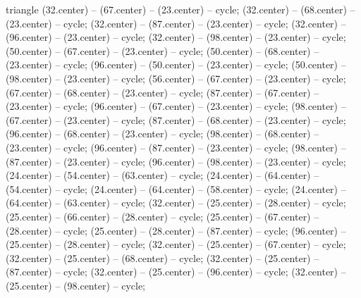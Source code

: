 \begin{pgfonlayer}{triangle}
 (32.center) -- (67.center) -- (23.center) -- cycle; 
 (32.center) -- (68.center) -- (23.center) -- cycle; 
 (32.center) -- (87.center) -- (23.center) -- cycle; 
 (32.center) -- (96.center) -- (23.center) -- cycle; 
 (32.center) -- (98.center) -- (23.center) -- cycle; 
 (50.center) -- (67.center) -- (23.center) -- cycle; 
 (50.center) -- (68.center) -- (23.center) -- cycle; 
 (96.center) -- (50.center) -- (23.center) -- cycle; 
 (50.center) -- (98.center) -- (23.center) -- cycle; 
 (56.center) -- (67.center) -- (23.center) -- cycle; 
 (67.center) -- (68.center) -- (23.center) -- cycle; 
 (87.center) -- (67.center) -- (23.center) -- cycle; 
 (96.center) -- (67.center) -- (23.center) -- cycle; 
 (98.center) -- (67.center) -- (23.center) -- cycle; 
 (87.center) -- (68.center) -- (23.center) -- cycle; 
 (96.center) -- (68.center) -- (23.center) -- cycle; 
 (98.center) -- (68.center) -- (23.center) -- cycle; 
 (96.center) -- (87.center) -- (23.center) -- cycle; 
 (98.center) -- (87.center) -- (23.center) -- cycle; 
 (96.center) -- (98.center) -- (23.center) -- cycle; 
 (24.center) -- (54.center) -- (63.center) -- cycle; 
 (24.center) -- (64.center) -- (54.center) -- cycle; 
 (24.center) -- (64.center) -- (58.center) -- cycle; 
 (24.center) -- (64.center) -- (63.center) -- cycle; 
 (32.center) -- (25.center) -- (28.center) -- cycle; 
 (25.center) -- (66.center) -- (28.center) -- cycle; 
 (25.center) -- (67.center) -- (28.center) -- cycle; 
 (25.center) -- (28.center) -- (87.center) -- cycle; 
 (96.center) -- (25.center) -- (28.center) -- cycle; 
 (32.center) -- (25.center) -- (67.center) -- cycle; 
 (32.center) -- (25.center) -- (68.center) -- cycle; 
 (32.center) -- (25.center) -- (87.center) -- cycle; 
 (32.center) -- (25.center) -- (96.center) -- cycle; 
 (32.center) -- (25.center) -- (98.center) -- cycle; 

\end{pgfonlayer}
